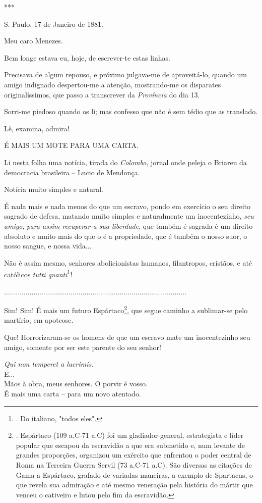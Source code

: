 ***

S. Paulo, 17 de Janeiro de 1881.

Meu caro Menezes.

Bem longe estava eu, hoje, de escrever-te estas linhas.

Precisava de algum repouso, e próximo julgava-me de aproveitá-lo, quando
um amigo indignado despertou-me a atenção, mostrando-me os disparates
originalíssimos, que passo a transcrever da \emph{Província} do dia 13.

Sorri-me piedoso quando os li; mas confesso que não é sem tédio que as
translado.

Lê, examina, admira!

É MAIS UM MOTE PARA UMA CARTA.

Li nesta folha uma notícia, tirada do \emph{Colombo}, jornal onde peleja
o Briareu da democracia brasileira -- Lucio de Mendonça.

Notícia muito simples e natural.

É nada mais e nada menos do que um escravo, pondo em exercício o seu
direito sagrado de defesa, matando muito simples e naturalmente um
inocentezinho, \emph{seu amigo}, \emph{para assim recuperar a sua
liberdade}, que também é sagrada é um direito absoluto e muito mais do
que o é a propriedade, que é também o nosso suor, o nosso sangue, e
nossa vida...

Não é assim mesmo, senhores abolicionistas humanos, filantropos,
cristãos, e até católicos \emph{tutti quanti}\footnote{. Do italiano,
  "todos eles".}!

.............................................................................................

Sim! Sim! É mais um futuro Espártaco\footnote{. Espártaco (109 a.C-71
  a.C) foi um gladiador-general, estrategista e líder popular que
  escapou da escravidão a que era submetido e, num levante de grandes
  proporções, organizou um exército que enfrentou o poder central de
  Roma na Terceira Guerra Servil (73 a.C-71 a.C). São diversas as
  citações de Gama a Espártaco, grafado de variadas maneiras, a exemplo
  de Spartacus, o que revela sua admiração e até mesmo veneração pela
  história do mártir que venceu o cativeiro e lutou pelo fim da
  escravidão.}, que segue caminho a sublimar-se pelo martírio, em
apoteose.

Que! Horrorizaram-se os homens de que um escravo mate um inocentezinho
seu amigo, somente por ser este parente do seu senhor!

\emph{Qui non temperet a lacrimis}.\\
E...\\
Mãos à obra, meus senhores. O porvir é vosso.\\
É mais uma carta -- para um novo atentado.

